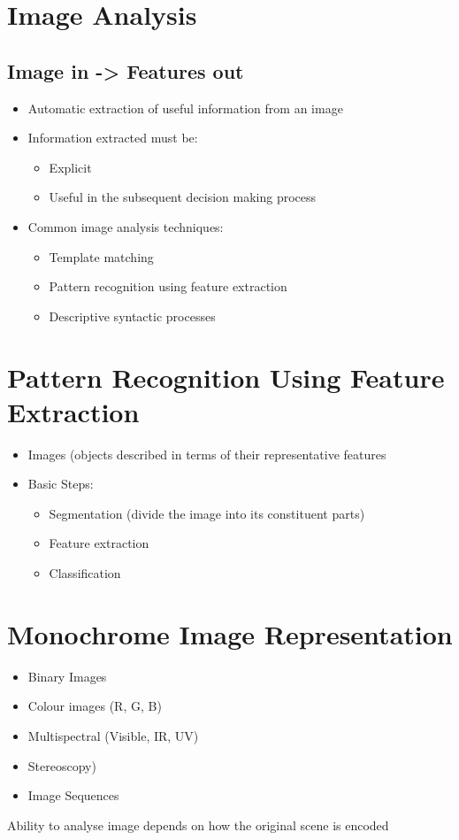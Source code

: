 \documentclass[a4paper]{article}
\begin{document}
	\section{Image Analysis}
	\subsection{Image in -> Features out}
	\begin{itemize}
		\item Automatic extraction of useful information from an image
		\item Information extracted must be:
		\begin{itemize}
			\item Explicit
			\item Useful in the subsequent decision making process
		\end{itemize}
	\item Common image analysis techniques:
	\begin{itemize}
		\item Template matching
		\item Pattern recognition using feature extraction
		\item Descriptive syntactic processes
	\end{itemize}
	\end{itemize}
	\section{Pattern Recognition Using Feature Extraction}
	\begin{itemize}
		\item Images (objects described in terms of their representative features
		\item Basic Steps:
		\begin{itemize}
			\item Segmentation (divide the image into its constituent parts)
			\item Feature extraction
			\item Classification
		\end{itemize}
	\end{itemize}
	\section{Monochrome Image Representation}
	\begin{itemize}
		\item Binary Images
		\item Colour images (R, G, B)
		\item Multispectral (Visible, IR, UV)
		\item Stereoscopy)
		\item Image Sequences
	\end{itemize}
	Ability to analyse image depends on how the original scene is encoded
\end{document}
